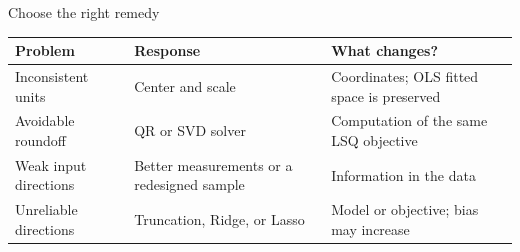 \begin{frame}{Choose the right remedy}
\small\begin{tabularx}{\textwidth}{@{}lYY@{}}\toprule
\textbf{Problem} & \textbf{Response} & \textbf{What changes?}\\\midrule
Inconsistent units & Center and scale & Coordinates; OLS fitted space is preserved\\[3pt]
Avoidable roundoff & QR or SVD solver & Computation of the same LSQ objective\\[3pt]
Weak input directions & Better measurements or a redesigned sample & Information in the data\\[3pt]
Unreliable directions & Truncation, Ridge, or Lasso & Model or objective; bias may increase\\\bottomrule
\end{tabularx}
\end{frame}


